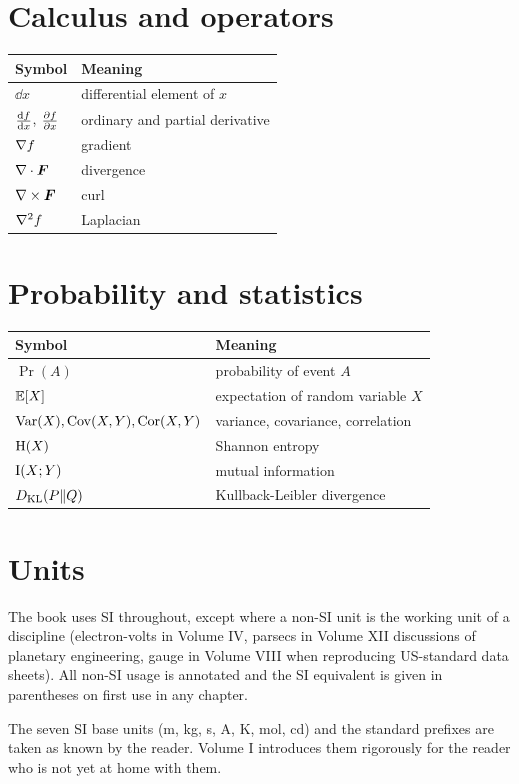 \section*{Calculus and operators}

\begin{tabular}{ll}
  \toprule
  Symbol & Meaning \\
  \midrule
  $\dd x$ & differential element of $x$ \\
  $\frac{\mathop{}\!\mathrm{d} f}{\mathop{}\!\mathrm{d} x}$, $\frac{\partial f}{\partial x}$ & ordinary and partial derivative \\
  $\nabla f$ & gradient \\
  $\nabla\cdot \bm{F}$ & divergence \\
  $\nabla\times \bm{F}$ & curl \\
  $\nabla^{2} f$ & Laplacian \\
  \bottomrule
\end{tabular}

\section*{Probability and statistics}

\begin{tabular}{ll}
  \toprule
  Symbol & Meaning \\
  \midrule
  $\Pr(A)$ & probability of event $A$ \\
  $\mathbb{E}[X]$ & expectation of random variable $X$ \\
  $\operatorname{Var}(X), \operatorname{Cov}(X,Y), \operatorname{Cor}(X,Y)$ & variance, covariance, correlation \\
  $\mathrm{H}(X)$ & Shannon entropy \\
  $\mathrm{I}(X;Y)$ & mutual information \\
  $D_{\mathrm{KL}}(P \| Q)$ & Kullback-Leibler divergence \\
  \bottomrule
\end{tabular}

\section*{Units}

The book uses SI throughout, except where a non-SI unit is the working unit of a discipline (electron-volts in Volume IV, parsecs in Volume XII discussions of planetary engineering, gauge in Volume VIII when reproducing US-standard data sheets). All non-SI usage is annotated and the SI equivalent is given in parentheses on first use in any chapter.

The seven SI base units (\si{\metre}, \si{\kilogram}, \si{\second}, \si{\ampere}, \si{\kelvin}, \si{\mole}, \si{\candela}) and the standard prefixes are taken as known by the reader. Volume I introduces them rigorously for the reader who is not yet at home with them.

